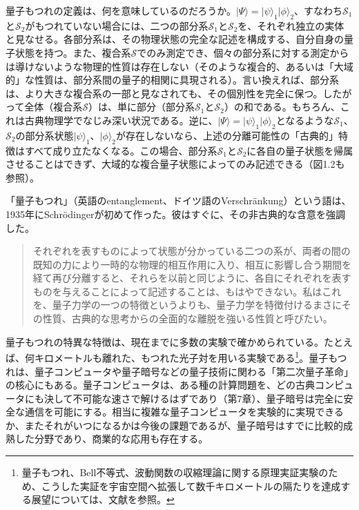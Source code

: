 量子もつれの定義は、何を意味しているのだろうか。$\lvert\Psi\rangle=\lvert\psi\rangle_1\lvert\phi\rangle_2$、すなわち$\mathcal S_1$と$\mathcal S_2$がもつれていない場合には、二つの部分系$\mathcal S_1$と$\mathcal S_2$を、それぞれ独立の実体と見なせる。各部分系は、その物理状態の完全な記述を構成する、自分自身の量子状態を持つ。また、複合系$\mathcal S$でのみ測定でき、個々の部分系に対する測定からは導けないような物理的性質は存在しない（そのような複合的、あるいは「大域的」な性質は、部分系間の量子的相関に具現される）。言い換えれば、部分系は、より大きな複合系の一部と見なされても、その個別性を完全に保つ。したがって全体（複合系$\mathcal S$）は、単に部分（部分系$\mathcal S_1$と$\mathcal S_2$）の和である。もちろん、これは古典物理学でなじみ深い状況である。逆に、$\lvert\Psi\rangle=\lvert\psi\rangle_1\lvert\phi\rangle_2$となるような$\mathcal S_1$、$\mathcal S_2$の部分系状態$\lvert\psi\rangle_1$、$\lvert\phi\rangle_2$が存在しないなら、上述の分離可能性の「古典的」特徴はすべて成り立たなくなる。この場合、部分系$\mathcal S_1$と$\mathcal S_2$に各自の量子状態を帰属させることはできず、大域的な複合量子状態によってのみ記述できる（図1.2も参照）。

「量子もつれ」（英語のentanglement、ドイツ語のVerschränkung）という語は、1935年にSchrödingerが初めて作った\cite{ref002,ref052,ref053}。彼はすぐに、その非古典的な含意を強調した\cite[p.~555]{ref052}。
\begin{quote}
それぞれを表すものによって状態が分かっている二つの系が、両者の間の既知の力により一時的な物理的相互作用に入り、相互に影響し合う期間を経て再び分離すると、それらを以前と同じように、各自にそれぞれを表すものを与えることによって記述することは、もはやできない。私はこれを、量子力学の一つの特徴というよりも、量子力学を特徴付けるまさにその性質、古典的な思考からの全面的な離脱を強いる性質と呼びたい。
\end{quote}

\hypertarget{srcpage:30}{}\label{srcpage:30}
量子もつれの特異な特徴は、現在までに多数の実験で確かめられている。たとえば、何キロメートルも離れた、もつれた光子対を用いる実験である\footnote{量子もつれ、Bell不等式、波動関数の収縮理論に関する原理実証実験のため、こうした実証を宇宙空間へ拡張して数千キロメートルの隔たりを達成する展望については、文献\cite{ref054}を参照。}。量子もつれは、量子コンピュータや量子暗号などの量子技術に関わる「第二次量子革命」\cite{ref055}の核心にもある。量子コンピュータは、ある種の計算問題を、どの古典コンピュータにも決して不可能な速さで解けるはずであり（第7章）、量子暗号は完全に安全な通信を可能にする。相当に複雑な量子コンピュータを実験的に実現できるか、またそれがいつになるかは今後の課題であるが、量子暗号はすでに比較的成熟した分野であり、商業的な応用も存在する。

